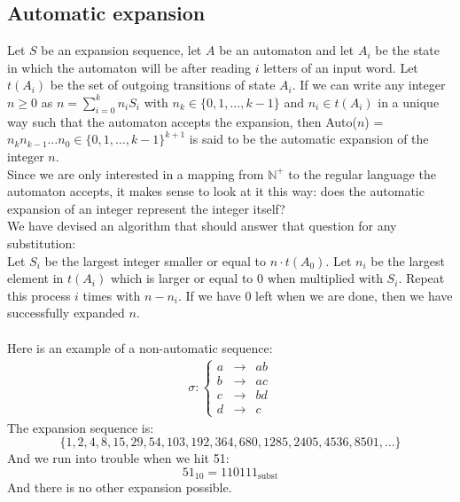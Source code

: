 \documentclass{article}
\begin{document}
\subsection{Automatic expansion}
Let $S$ be an expansion sequence, let $A$ be an automaton and let $A_i$ be 
the state in which the automaton will be after reading $i$ letters of an 
input word. Let $t(A_i)$ be the set of outgoing transitions of state $A_i$.
If we can write any integer $n \ge 0$ as $n = \sum_{i = 0}^k n_i S_i$ with 
$n_k \in \{0, 1, \ldots, k - 1\}$ and $n_i \in t(A_i)$ in a unique way such 
that the automaton accepts the expansion, then Auto($n$) = 
$n_k n_{k - 1} \ldots n_0 \in \{0, 1, \ldots, k - 1\}^{k + 1}$ is said to be 
the automatic expansion of the integer $n$.\\
Since we are only interested in a mapping from $\mathbb{N}^+$ to the regular
language the automaton accepts, it makes sense to look at it this way: does
the automatic expansion of an integer represent the integer itself?\\
We have devised an algorithm that should answer that question for any
substitution:\\
Let $S_i$ be the largest integer smaller or equal to $n \cdot t(A_0)$. Let 
$n_i$ be the largest element in $t(A_i)$ which is larger or equal to 0 when 
multiplied with $S_i$. Repeat this process $i$ times with $n - n_i$. If we have
0 left when we are done, then we have successfully expanded $n$.\\
\\
Here is an example of a non-automatic sequence:
\begin{eqnarray*}
\sigma: \left\{ \begin{array}{lll}
a &\rightarrow& ab\\
b &\rightarrow& ac\\
c &\rightarrow& bd\\
d &\rightarrow& c
\end{array} \right.
\end{eqnarray*}
The expansion sequence is:
\begin{displaymath}
\{1, 2, 4, 8, 15, 29, 54, 103, 192, 364, 680, 1285, 2405, 4536, 8501, \ldots \}
\end{displaymath}
And we run into trouble when we hit 51:
\begin{displaymath}
51_{10} = 110111_{\mathrm{subst}}
\end{displaymath}
And there is no other expansion possible.\\
\\
\end{document}
